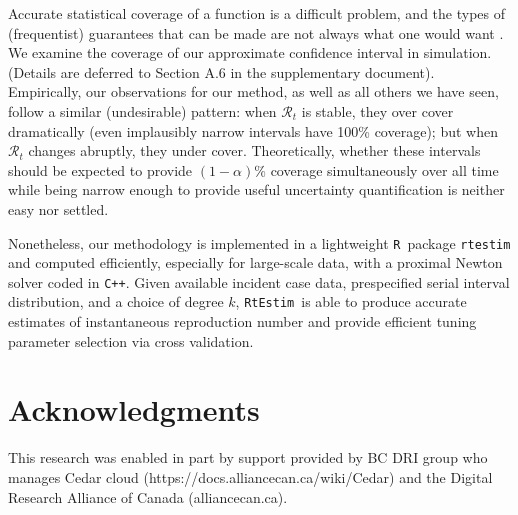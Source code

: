 \documentclass[10pt,letterpaper]{article}
\newcommand{\R}{\texttt{R}}
\newcommand{\cpp}{\texttt{C++}}
\def\RtEstim{\texttt{RtEstim}}
\begin{document}
Accurate statistical coverage of a function is a difficult problem, and the
types of (frequentist) guarantees that can be made are not always what one would
want \cite{genovese2008adaptive}. We examine the coverage of our approximate
confidence interval in simulation. (Details are deferred to Section A.6 in the
supplementary document). Empirically, our observations for our method, as well
as all others we have seen, follow a similar (undesirable) pattern: when
$\mathcal{R}_t$ is stable, they over cover dramatically (even implausibly narrow
intervals have 100\% coverage); but when $\mathcal{R}_t$ changes abruptly, they
under cover. Theoretically, whether these intervals should be expected to
provide $(1-\alpha)\%$ coverage simultaneously over all time while being narrow
enough to provide useful uncertainty quantification is neither easy nor settled. 


Nonetheless, our methodology is implemented in a lightweight \R\ package
\texttt{rtestim} and computed efficiently, especially for large-scale data, with
a proximal Newton solver coded in \cpp. Given available incident case data,
prespecified serial interval distribution, and a choice of degree $k$, \RtEstim\
is able to produce accurate estimates of instantaneous reproduction number and
provide efficient tuning parameter selection via cross validation. 


%
%


\section*{Acknowledgments}

This research was enabled in part by support provided by 
BC DRI group who manages Cedar cloud (https://docs.alliancecan.ca/wiki/Cedar)
and the Digital Research Alliance of Canada (alliancecan.ca).

\nolinenumbers

%
%
% 


 


\end{document}
